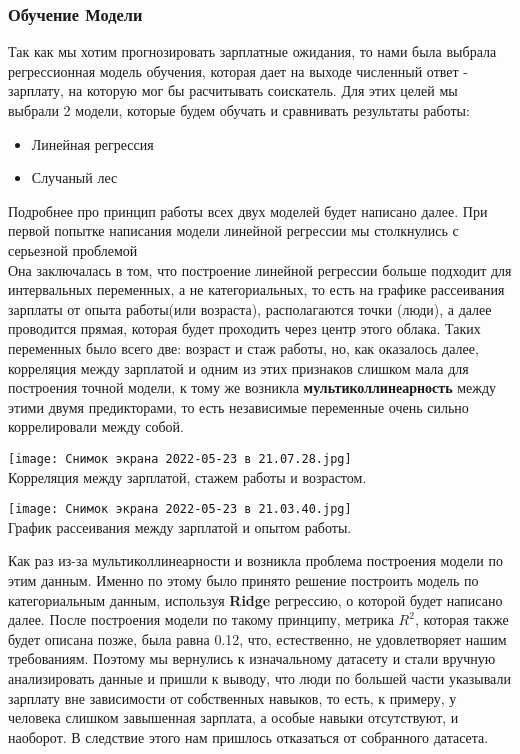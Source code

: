 \documentclass{article}
\begin{document}
\subsubsection{Обучение Модели}
Так как мы хотим прогнозировать зарплатные ожидания, то нами была выбрала регрессионная модель обучения, которая дает на выходе численный ответ - зарплату, на которую мог бы расчитывать соискатель. Для этих целей мы выбрали 2 модели, которые будем обучать и сравнивать результаты работы:
\begin{itemize}
  \color{red}
  \item \color{black} Линейная регрессия
  \color{red}
  \item \color{black} Случаный лес
\end{itemize}
Подробнее про принцип работы всех двух моделей будет написано далее.
При первой попытке написания модели линейной регрессии мы столкнулись с серьезной проблемой\\
Она заключалась в том, что построение линейной регрессии больше подходит для интервальных переменных, а не категориальных, то есть на графике рассеивания зарплаты от опыта работы(или возраста), располагаются точки (люди), а далее проводится прямая, которая будет проходить через центр этого облака. Таких переменных было всего две: возраст и стаж работы, но, как оказалось далее, корреляция между зарплатой и одним из этих признаков слишком мала для построения точной модели, к тому же возникла \textbf{мультиколлинеарность} между этими двумя предикторами, то есть независимые переменные очень сильно коррелировали между собой.\\ 
\begin{center}
    

\texttt{[image: Снимок экрана 2022-05-23 в 21.07.28.jpg]}\\
Корреляция между зарплатой, стажем работы и возрастом.\\
\end{center}
\begin{center}
    

\texttt{[image: Снимок экрана 2022-05-23 в 21.03.40.jpg]}\\
График рассеивания между зарплатой и опытом работы.\\
\end{center}


Как раз из-за мультиколлинеарности и возникла проблема построения модели по этим данным. Именно по этому было принято решение построить модель по категориальным данным, используя \textbf{Ridge} регрессию, о которой будет написано далее. После построения модели по такому принципу, метрика \(R^2\), которая также будет описана позже, была равна 0.12, что, естественно, не удовлетворяет нашим требованиям. Поэтому мы вернулись к изначальному датасету и стали вручную анализировать данные и пришли к выводу, что люди по большей части указывали зарплату вне зависимости от собственных навыков, то есть, к примеру, у человека слишком завышенная зарплата, а особые навыки отсутствуют, и наоборот. В следствие этого нам пришлось отказаться от собранного датасета.
\end{document}
